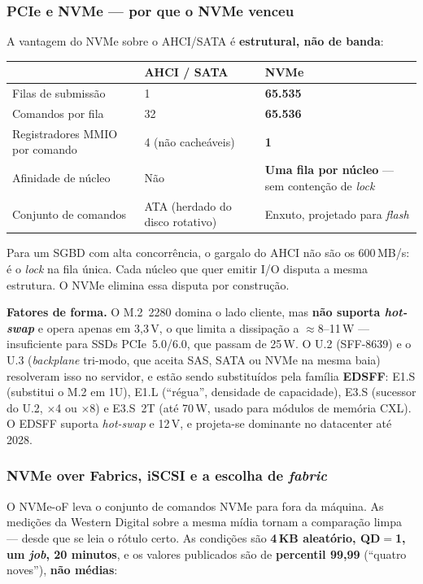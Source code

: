 \documentclass[11pt,a4paper]{article}
\begin{document}
\subsubsection{PCIe e NVMe --- por que o NVMe venceu}

A vantagem do NVMe sobre o AHCI/SATA é \textbf{estrutural, não de banda}:

\begin{center}\small
\begin{tabular}{@{}p{5.6cm}p{4.2cm}p{4.6cm}@{}}
\toprule
 & \textbf{AHCI / SATA} & \textbf{NVMe} \\
\midrule
Filas de submissão & 1 & \textbf{65.535} \\
Comandos por fila & 32 & \textbf{65.536} \\
Registradores MMIO por comando & 4 (não cacheáveis) & \textbf{1} \\
Afinidade de núcleo & Não & \textbf{Uma fila por núcleo} --- sem contenção de \emph{lock} \\
Conjunto de comandos & ATA (herdado do disco rotativo) & Enxuto, projetado para \emph{flash} \\
\bottomrule
\end{tabular}
\end{center}

Para um SGBD com alta concorrência, o gargalo do AHCI não são os 600\,MB/s: é o
\emph{lock} na fila única. Cada núcleo que quer emitir I/O disputa a mesma estrutura. O
NVMe elimina essa disputa por construção.

\textbf{Fatores de forma.} O M.2~2280 domina o lado cliente, mas \textbf{não suporta
\emph{hot-swap}} e opera apenas em 3,3\,V, o que limita a dissipação a $\approx$8--11\,W ---
insuficiente para SSDs PCIe~5.0/6.0, que passam de 25\,W. O U.2 (SFF-8639) e o U.3
(\emph{backplane} tri-modo, que aceita SAS, SATA ou NVMe na mesma baia) resolveram isso no
servidor, e estão sendo substituídos pela família \textbf{EDSFF}: E1.S (substitui o M.2 em
1U), E1.L (``régua'', densidade de capacidade), E3.S (sucessor do U.2, $\times$4 ou
$\times$8) e E3.S~2T (até 70\,W, usado para módulos de memória CXL). O EDSFF suporta
\emph{hot-swap} e 12\,V, e projeta-se dominante no datacenter até 2028.

\subsubsection{NVMe over Fabrics, iSCSI e a escolha de \emph{fabric}}

O NVMe-oF leva o conjunto de comandos NVMe para fora da máquina. As medições da Western
Digital sobre a mesma mídia tornam a comparação limpa --- desde que se leia o rótulo certo.
As condições são \textbf{4\,KB aleatório, QD$=$1, um \emph{job}, 20 minutos}, e os valores
publicados são de \textbf{percentil 99,99} (``quatro noves''), \textbf{não médias}:
\end{document}
